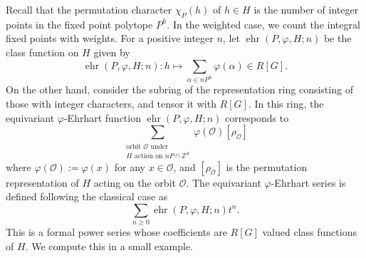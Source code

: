 \documentclass[12pt,reqno]{amsart}
\theoremstyle{definition}
\theoremstyle{remark}
\newcommand{\Z}{\mathbb{Z}}
\DeclareMathOperator{\ehr}{ehr}
\begin{document}
Recall that the permutation character $\chi_P(h)$ of $h \in H$ is the number of integer points in the fixed point polytope $P^h$.  In the weighted case, we count the integral fixed points with weights. For a positive integer $n$, let $\ehr(P,\varphi,H; n)$ be the class function on $H$ given by \[\ehr(P,\varphi,H; n) : h \mapsto \sum_{\alpha \in nP^h} \varphi(\alpha) \in R[G]. \]
On the other hand, consider the subring of the representation ring consisting of those with integer characters, and tensor it with $R[G]$.  In this ring, the equivariant $\varphi$-Ehrhart function $\ehr(P,\varphi,H; n)$ corresponds to 
\[\sum_{\substack{\text{orbit }\mathcal{O}\text{ under } \\ H \text{ action on } nP \cap \Z^d}} \varphi(\mathcal O)[\rho_\mathcal{O}]\]
where $\varphi(\mathcal O):=\varphi(x)$ for any $x \in \mathcal{O}$, and $[\rho_\mathcal{O}]$ is the permutation representation of $H$ acting on the orbit $\mathcal O$.  
The equivariant $\varphi$-Ehrhart series is defined following the classical case as
\[
\sum_{n \geq 0} \ehr(P,\varphi,H; n) t^n.
\]
This is a formal power series whose coefficients are $R[G]$ valued class functions of $H$. We compute this in a small example.  
\end{document}
